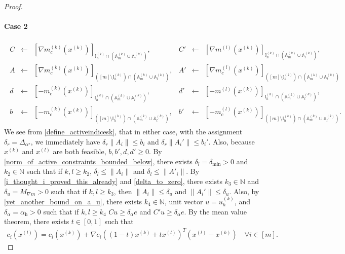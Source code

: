 \documentclass{article}
\theoremstyle{case}
\numberwithin{theorem}{subsection}
\newcommand{\minangledelta}{{\Delta_{\alpha^{\star}}}}
\newcommand{\naturals}{\mathbb N}
\newcommand{\xk}{x^{(k)}}
\newcommand{\xl}{{x^{(l)}}}
\newcommand{\maxmodelgrad}{{M_{\nabla m}}}
\newcommand{\activeindicesk}{{ \mathbb I_h^{(k)} }}
\newcommand{\deltalb}{{\delta_{\textrm{min}}}}
\newcommand{\minactivealpha}{{ \alpha_{\textrm{h}} }}
\newcommand{\activedirk}{{ u_{h}^{(k)} }}
\newcommand{\Amk}{{\mathbb A_m^{(k)}}}
\newcommand{\Alk}{{\mathbb A_l^{(k)}}}
\begin{document}
\begin{proof}
\paragraph{Case 2}
\begin{align*}
\begin{array}{cclccl}
C  &\gets& \left[\nabla m^{(k)}_c\left(\xk\right)\right]_{\activeindicesk \cap \left(\Amk \cup \Alk \right)}, &
C' &\gets& \left[\nabla m^{(l)}\left(\xk\right)\right]_{\activeindicesk \cap \left(\Amk \cup \Alk \right)}, \\
A  &\gets& \left[\nabla m^{(k)}_c\left(\xk\right)\right]_{\left([m] \setminus \activeindicesk\right) \cap \left(\Amk \cup \Alk \right)}, &
A' &\gets& \left[\nabla m^{(l)}_c\left(\xk\right)\right]_{\left([m] \setminus \activeindicesk\right) \cap \left(\Amk \cup \Alk \right)} \\
d  &\gets& \left[-m^{(k)}_c\left(\xk\right)\right]_{\activeindicesk \cap \left(\Amk \cup \Alk \right)}, &
d' &\gets& \left[-m^{(l)}\left(\xk\right)\right]_{\activeindicesk \cap \left(\Amk \cup \Alk \right)}, \\
b  &\gets& \left[-m^{(k)}_c\left(\xk\right)\right]_{\left([m] \setminus \activeindicesk\right) \cap \left(\Amk \cup \Alk \right)}, &
b' &\gets& \left[-m^{(l)}_c\left(\xk\right)\right]_{\left([m] \setminus \activeindicesk\right) \cap \left(\Amk \cup \Alk \right)}.
\end{array}
\end{align*}
We see from \cref{define_activeindicesk}, that in either case, with the assignment $\delta_r = \minangledelta$, we immediately have 
$\delta_r \|A_i\| \le b_i$ and $\delta_r \|A_i'\| \le b_i'$.
Also, because $\xk$ and $\xl$ are both feasible, $b, b', d, d' \ge 0$.
By \cref{norm_of_active_constraints_bounded_below}, there exists $\delta_l = \deltalb > 0$ and $k_2 \in \naturals$ such that if $k, l \ge k_2$,
$\delta_l \le \|A_i\|$ and $\delta_l \le \|A'_i\|$.
By \cref{i_thought_i_proved_this_already} and \cref{delta_to_zero}, there exists $k_3 \in \naturals$ and $\delta_u = \maxmodelgrad > 0$ such that if $k, l \ge k_3$,
then
$\|A_i\| \le \delta_u$ and $\|A_i'\| \le \delta_u$.
Also, by \cref{yet_another_bound_on_a_u}, there exists $k_4 \in \naturals$, unit vector $u = \activedirk$, and $\delta_{\alpha} = \minactivealpha > 0$ such that if $k, l \ge k_4$
$Cu \ge \delta_{\alpha} e$ and $C'u \ge \delta_{\alpha} e$.
By the mean value theorem, there exists $t \in [0, 1]$ such that
\begin{align*}
c_i\left(\xl\right) = c_i\left(\xk\right) + \nabla c_i\left((1 - t)\xk + t \xl\right)^T\left(\xl - \xk\right) \quad \forall i \in [m].

\end{align*}
\end{proof}
\end{document}
